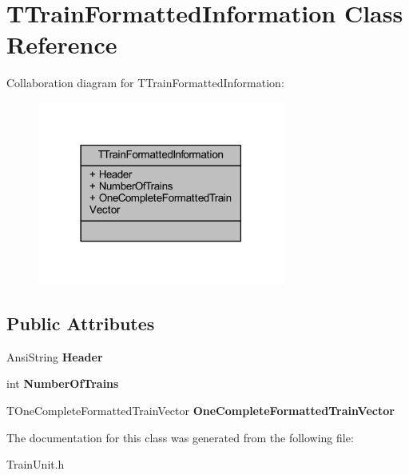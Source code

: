 \hypertarget{class_t_train_formatted_information}{}\section{T\+Train\+Formatted\+Information Class Reference}
\label{class_t_train_formatted_information}


Collaboration diagram for T\+Train\+Formatted\+Information\+:\nopagebreak
\begin{figure}[H]
\begin{center}
\leavevmode
\includegraphics[width=230pt]{class_t_train_formatted_information__coll__graph}
\end{center}
\end{figure}
\subsection*{Public Attributes}
\begin{DoxyCompactItemize}
\item 
\mbox{\label{class_t_train_formatted_information_a03b72f64d740876d99d1080b8d355441}} 
Ansi\+String {\bfseries Header}
\item 
\mbox{\label{class_t_train_formatted_information_a2f5bc8f1ff9b154a381660639c40dada}} 
int {\bfseries Number\+Of\+Trains}
\item 
\mbox{\label{class_t_train_formatted_information_a7ed8168782c7afd5f7b42b41f5515c8f}} 
T\+One\+Complete\+Formatted\+Train\+Vector {\bfseries One\+Complete\+Formatted\+Train\+Vector}
\end{DoxyCompactItemize}


The documentation for this class was generated from the following file\+:\begin{DoxyCompactItemize}
\item 
Train\+Unit.\+h\end{DoxyCompactItemize}
